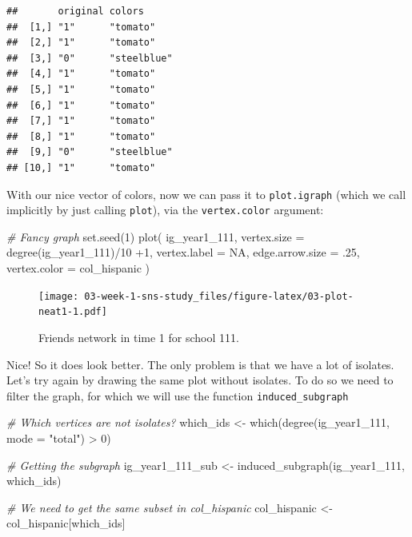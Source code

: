 \documentclass[
]{book}
\newenvironment{Shaded}{\begin{snugshade}}{\end{snugshade}}
\newcommand{\AttributeTok}[1]{\textcolor[rgb]{0.77,0.63,0.00}{#1}}
\newcommand{\CommentTok}[1]{\textcolor[rgb]{0.56,0.35,0.01}{\textit{#1}}}
\newcommand{\ConstantTok}[1]{\textcolor[rgb]{0.00,0.00,0.00}{#1}}
\newcommand{\DecValTok}[1]{\textcolor[rgb]{0.00,0.00,0.81}{#1}}
\newcommand{\FunctionTok}[1]{\textcolor[rgb]{0.00,0.00,0.00}{#1}}
\newcommand{\NormalTok}[1]{#1}
\newcommand{\OtherTok}[1]{\textcolor[rgb]{0.56,0.35,0.01}{#1}}
\newcommand{\SpecialCharTok}[1]{\textcolor[rgb]{0.00,0.00,0.00}{#1}}
\newcommand{\StringTok}[1]{\textcolor[rgb]{0.31,0.60,0.02}{#1}}
\begin{document}
\begin{verbatim}
##       original colors     
##  [1,] "1"      "tomato"   
##  [2,] "1"      "tomato"   
##  [3,] "0"      "steelblue"
##  [4,] "1"      "tomato"   
##  [5,] "1"      "tomato"   
##  [6,] "1"      "tomato"   
##  [7,] "1"      "tomato"   
##  [8,] "1"      "tomato"   
##  [9,] "0"      "steelblue"
## [10,] "1"      "tomato"
\end{verbatim}

With our nice vector of colors, now we can pass it to \texttt{plot.igraph} (which we call implicitly by just calling \texttt{plot}), via the \texttt{vertex.color} argument:

\begin{Shaded}
\begin{Highlighting}[]
\CommentTok{\# Fancy graph}
\FunctionTok{set.seed}\NormalTok{(}\DecValTok{1}\NormalTok{)}
\FunctionTok{plot}\NormalTok{(}
\NormalTok{  ig\_year1\_111,}
  \AttributeTok{vertex.size     =} \FunctionTok{degree}\NormalTok{(ig\_year1\_111)}\SpecialCharTok{/}\DecValTok{10} \SpecialCharTok{+}\DecValTok{1}\NormalTok{,}
  \AttributeTok{vertex.label    =} \ConstantTok{NA}\NormalTok{,}
  \AttributeTok{edge.arrow.size =}\NormalTok{ .}\DecValTok{25}\NormalTok{,}
  \AttributeTok{vertex.color    =}\NormalTok{ col\_hispanic}
\NormalTok{  )}
\end{Highlighting}
\end{Shaded}

\begin{figure}
\centering
\texttt{[image: 03-week-1-sns-study\_files/figure-latex/03-plot-neat1-1.pdf]}
\caption{\label{fig:03-plot-neat1}Friends network in time 1 for school 111.}
\end{figure}

Nice! So it does look better. The only problem is that we have a lot of isolates. Let's try again by drawing the same plot without isolates. To do so we need to filter the graph, for which we will use the function \texttt{induced\_subgraph}

\begin{Shaded}
\begin{Highlighting}[]
\CommentTok{\# Which vertices are not isolates?}
\NormalTok{which\_ids }\OtherTok{\textless{}{-}} \FunctionTok{which}\NormalTok{(}\FunctionTok{degree}\NormalTok{(ig\_year1\_111, }\AttributeTok{mode =} \StringTok{"total"}\NormalTok{) }\SpecialCharTok{\textgreater{}} \DecValTok{0}\NormalTok{)}

\CommentTok{\# Getting the subgraph}
\NormalTok{ig\_year1\_111\_sub }\OtherTok{\textless{}{-}} \FunctionTok{induced\_subgraph}\NormalTok{(ig\_year1\_111, which\_ids)}

\CommentTok{\# We need to get the same subset in col\_hispanic}
\NormalTok{col\_hispanic }\OtherTok{\textless{}{-}}\NormalTok{ col\_hispanic[which\_ids]}
\end{Highlighting}
\end{Shaded}
\end{document}
